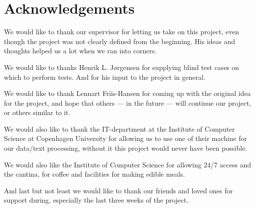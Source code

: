 \chapter*{Acknowledgements}
We would like to thank our supervisor for letting us take on this
project, even though the project was not clearly defined from the
beginning. His ideas and thoughts helped us a lot when we ran into
corners.

We would like to thanks Henrik L. J\o rgensen for supplying blind test
cases on which to perform tests. And for his input to the project in
general.

We would like to thank Lennart Friis-Hansen for coming up with the
original idea for the project, and hope that others --- in the future
--- will continue our project, or others similar to it.

We would also like to thank the IT-department at the Institute of
Computer Science at Copenhagen University for allowing us to use one
of their machine for our data/text processing, without it this project
would never have been possible.

We would also like the Institute of Computer Science for allowing 24/7
access and the cantina, for coffee and facilities for making edible
meals.

And last but not least we would like to thank our friends and loved
ones for support during, especially the last three weeks of the
project.
